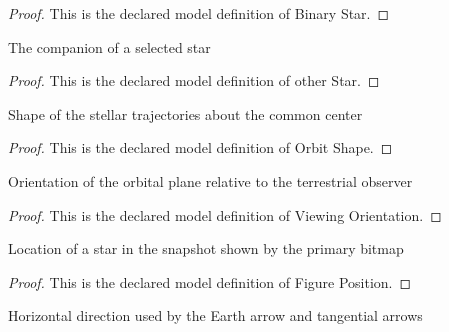 \begin{proof}
  This is the declared model definition of Binary Star.
\end{proof}
\begin{definition}
  \label{def:physics:phyx-mini-0611:phyxminiproblems-problemphyxmini0611-otherstar}
  The companion of a selected star
\end{definition}
\begin{proof}
  This is the declared model definition of other Star.
\end{proof}
\begin{definition}
  \label{def:physics:phyx-mini-0611:phyxminiproblems-problemphyxmini0611-orbitshape}
  Shape of the stellar trajectories about the common center
\end{definition}
\begin{proof}
  This is the declared model definition of Orbit Shape.
\end{proof}
\begin{definition}
  \label{def:physics:phyx-mini-0611:phyxminiproblems-problemphyxmini0611-viewingorientation}
  Orientation of the orbital plane relative to the terrestrial observer
\end{definition}
\begin{proof}
  This is the declared model definition of Viewing Orientation.
\end{proof}
\begin{definition}
  \label{def:physics:phyx-mini-0611:phyxminiproblems-problemphyxmini0611-figureposition}
  Location of a star in the snapshot shown by the primary bitmap
\end{definition}
\begin{proof}
  This is the declared model definition of Figure Position.
\end{proof}
\begin{definition}
  \label{def:physics:phyx-mini-0611:phyxminiproblems-problemphyxmini0611-horizontaldirection}
  Horizontal direction used by the Earth arrow and tangential arrows
\end{definition}
